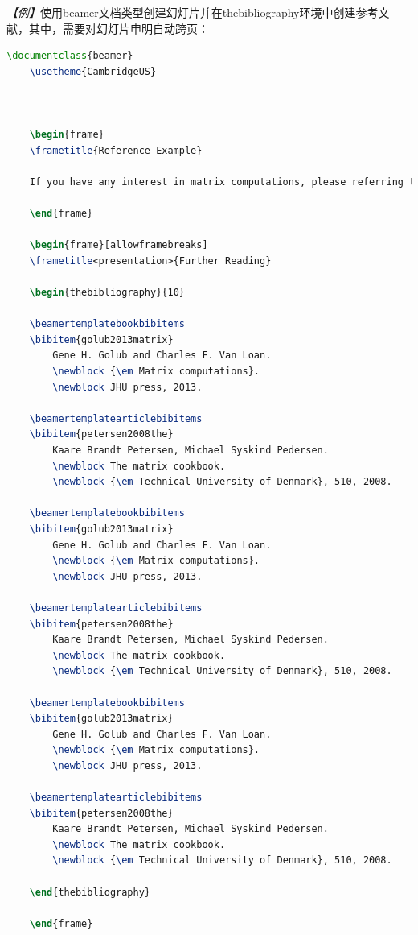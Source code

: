 \emph{【例】}使用beamer文档类型创建幻灯片并在thebibliography环境中创建参考文献，其中，需要对幻灯片申明自动跨页：
\begin{lstlisting}[language=TeX]
    \documentclass{beamer}
    \usetheme{CambridgeUS}

    

    \begin{frame}
    \frametitle{Reference Example}

    If you have any interest in matrix computations, please referring to \cite{golub2013matrix, petersen2008the}.

    \end{frame}

    \begin{frame}[allowframebreaks]
    \frametitle<presentation>{Further Reading}

    \begin{thebibliography}{10}

    \beamertemplatebookbibitems
    \bibitem{golub2013matrix}
        Gene H. Golub and Charles F. Van Loan.
        \newblock {\em Matrix computations}.
        \newblock JHU press, 2013.

    \beamertemplatearticlebibitems
    \bibitem{petersen2008the}
        Kaare Brandt Petersen, Michael Syskind Pedersen.
        \newblock The matrix cookbook.
        \newblock {\em Technical University of Denmark}, 510, 2008.

    \beamertemplatebookbibitems
    \bibitem{golub2013matrix}
        Gene H. Golub and Charles F. Van Loan.
        \newblock {\em Matrix computations}.
        \newblock JHU press, 2013.

    \beamertemplatearticlebibitems
    \bibitem{petersen2008the}
        Kaare Brandt Petersen, Michael Syskind Pedersen.
        \newblock The matrix cookbook.
        \newblock {\em Technical University of Denmark}, 510, 2008.

    \beamertemplatebookbibitems
    \bibitem{golub2013matrix}
        Gene H. Golub and Charles F. Van Loan.
        \newblock {\em Matrix computations}.
        \newblock JHU press, 2013.

    \beamertemplatearticlebibitems
    \bibitem{petersen2008the}
        Kaare Brandt Petersen, Michael Syskind Pedersen.
        \newblock The matrix cookbook.
        \newblock {\em Technical University of Denmark}, 510, 2008.

    \end{thebibliography}

    \end{frame}

    
\end{lstlisting}

